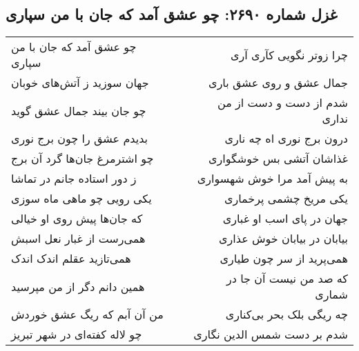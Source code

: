 \begin{center}
\section*{غزل شماره ۲۶۹۰: چو عشق آمد که جان با من سپاری}
\label{sec:2690}
\begin{longtable}{l p{0.5cm} r}
چو عشق آمد که جان با من سپاری
&&
چرا زوتر نگویی کآری آری
\\
جهان سوزید ز آتش‌های خوبان
&&
جمال عشق و روی عشق باری
\\
چو جان بیند جمال عشق گوید
&&
شدم از دست و دست از من نداری
\\
بدیدم عشق را چون برج نوری
&&
درون برج نوری اه چه ناری
\\
چو اشترمرغ جان‌ها گرد آن برج
&&
غذاشان آتشی بس خوشگواری
\\
ز دور استاده جانم در تماشا
&&
به پیش آمد مرا خوش شهسواری
\\
یکی رویی چو ماهی ماه سوزی
&&
یکی مریخ چشمی پرخماری
\\
که جان‌ها پیش روی او خیالی
&&
جهان در پای اسب او غباری
\\
همی‌رست از غبار نعل اسبش
&&
بیابان در بیابان خوش عذاری
\\
همی‌تازید عقلم اندک اندک
&&
همی‌پرید از سر چون طیاری
\\
همین دانم دگر از من مپرسید
&&
که صد من نیست آن جا در شماری
\\
من آن آبم که ریگ عشق خوردش
&&
چه ریگی بلک بحر بی‌کناری
\\
چو لاله کفته‌ای در شهر تبریز
&&
شدم بر دست شمس الدین نگاری
\\
\end{longtable}
\end{center}
